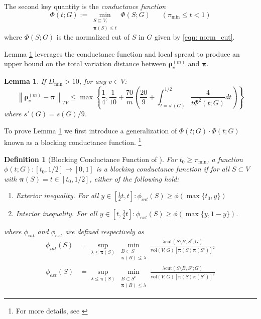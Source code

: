 \documentclass{article}
\newcommand{\vol}{\mathrm{vol}}
\newcommand{\norm}[1]{\left\lVert#1\right\rVert}
\newcommand{\1}{\mathbf{1}}
\newcommand{\cut}{\mathrm{cut}}
\newcommand{\pibf}{\bm{\pi}}
\newcommand{\rhobf}{\bm{\rho}}
\theoremstyle{aldenthm}
\newtheorem{lemma}{Lemma}
\newtheorem{definition}{Definition}
\begin{document}
The second key quantity is the \emph{conductance function}
\begin{equation}
\label{eqn: conductance_function}
\Phi(t; G) := \min_{\substack{S \subseteq V, \\ \pibf(S) \leq t} } \Phi(S; G) ~~~~~~~ (\pi_{\min} \leq t < 1)
\end{equation}
where $\Phi(S; G)$ is the normalized cut of $S$ in $G$ given by \eqref{eqn: norm_cut}. 

Lemma \ref{lem: expansion_to_tv_distance} leverages the conductance function and local spread to produce an upper bound on the total variation distance between $\rhobf_{v}^{(m)}$ and $\pibf.$
\begin{lemma}
	\label{lem: expansion_to_tv_distance}
	If $D_{\min} > 10$, for any $v \in V$:
	\begin{equation*}
	\norm{\rhobf_v^{(m)} - \pibf}_{TV} \leq \max\left\{ \frac{1}{4}, \frac{1}{10} +  \frac{70}{m}\left(\frac{20}{9} + \int_{t = s'(G)}^{1/2} \frac{4}{t \Phi^2(t; G)} dt\right) \right\}
	\end{equation*}
	where $s'(G) = s(G) / 9$.
\end{lemma}

To prove Lemma \ref{lem: expansion_to_tv_distance} we first introduce a generalization of $\Phi(t;G) \cdot \Phi(t;G)$ known as a blocking conductance function.
\footnote{For more details, see \cite{montenegro2002}}

\begin{definition}[Blocking Conductance Function of \cite{montenegro2002}]
	\label{def: blocking_conductance_function}
	For $t_0 \geq \pi_{\min}$, a function $\phi(t; G): [t_0, 1/2] \to [0,1]$ is a \emph{blocking conductance function} if for all $S \subset V$ with $\pibf(S) = t \in [t_0, 1/2]$, either of the following hold: 
	\begin{enumerate}
		\item \emph{Exterior inequality.} For all $y \in \left[\frac{1}{2}t, t\right]: \phi_{int}(S) \geq \phi(\max\{t_0,y\})$
		\item \emph{Interior inequality.} For all $y  \in \left[t, \frac{3}{2}t\right]: \phi_{ext}(S) \geq \phi(\max\{y,1 - y\})$.
	\end{enumerate}
	where $\phi_{int}$ and $\phi_{ext}$ are defined respectively as
	\begin{align*}
	\phi_{int}(S) & = \sup_{\lambda \leq \pibf(S)} \min_{\substack{B \subset S \\ \pibf(B) \leq \lambda} } \frac{\lambda \cut(S \setminus B, S^c; G)}{\vol(V; G) \left[\pibf(S) \pibf(S^c)\right]^2} \\
	\phi_{ext}(S) & = \sup_{\lambda \leq \pibf(S)} \min_{\substack{B \subset S^c \\ \pibf(B) \leq \lambda} } \frac{\lambda \cut(S \setminus B, S^c; G)}{\vol(V; G) \left[\pibf(S) \pibf(S^c)\right]^2}
	\end{align*}
\end{definition}
\end{document}
